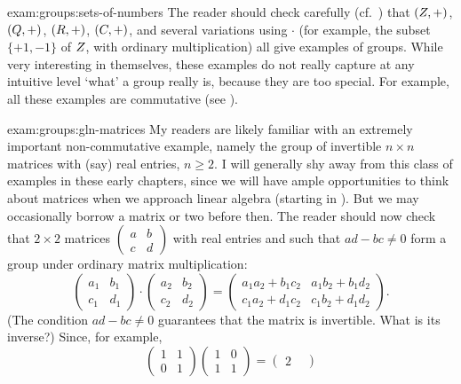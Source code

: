 \begin{exam}{}{exam:groups:sets-of-numbers}
  The reader should check carefully (cf.\
  ) that $(Z, +)$, $(Q, +)$,
  $(R, +)$, $(C, +)$, and several variations using $\cdot$ (for
  example, the subset $\{+1, -1\}$ of $Z$, with ordinary
  multiplication) all give examples of groups. While very interesting
  in themselves, these examples do not really capture at any intuitive
  level `what' a group really is, because they are too special. For
  example, all these examples are commutative (see
  ).
\end{exam}
\begin{exam}{}{exam:groups:gln-matrices}
  My readers are likely familiar with an extremely important
  non-commutative example, namely the group of invertible $n \times n$
  matrices with (say) real entries, $n \geq 2$. I will generally shy
  away from this class of examples in these early chapters, since we
  will have ample opportunities to think about matrices when we
  approach linear algebra (starting in ). But we may
  occasionally borrow a matrix or two before then. The reader should
  now check that $2 \times 2$ matrices
  $\begin{pmatrix} a & b \\ c & d \end{pmatrix}$ with real entries and
  such that $ad - bc \neq 0$ form a group under ordinary matrix
  multiplication:
  \[
    \begin{pmatrix} a_1 & b_1 \\ c_1 & d_1 \end{pmatrix} \cdot
    \begin{pmatrix} a_2 & b_2 \\ c_2 & d_2 \end{pmatrix} =
    \begin{pmatrix} a_1 a_2 + b_1 c_2 & a_1 b_2 + b_1 d_2 \\
      c_1 a_2 + d_1 c_2 & c_1 b_2 + d_1 d_2 \end{pmatrix}.
  \]
  (The condition $ad - bc \neq 0$ guarantees that the matrix is
  invertible. What is its inverse?) Since, for example,
  \[
    \begin{pmatrix} 1 & 1 \\ 0 & 1 \end{pmatrix}
    \begin{pmatrix} 1 & 0 \\ 1 & 1 \end{pmatrix} = \begin{pmatrix} 2 &

\end{pmatrix}\]
\end{exam}
